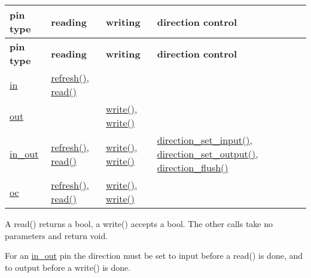 \tabulinesep=1mm
\begin{longtabu} spread 0pt [c]{*{4}{|X[-1]}|}
\hline
\rowcolor{\tableheadbgcolor}\textbf{ pin type }&\textbf{ reading }&\textbf{ writing }&\textbf{ direction control  }\\
\endfirsthead
\hline
\endfoot
\hline
\rowcolor{\tableheadbgcolor}\textbf{ pin type }&\textbf{ reading }&\textbf{ writing }&\textbf{ direction control  }\\
\endhead
\hyperlink{classhwlib_1_1pin__in}{in} &\hyperlink{classhwlib_1_1pin__in_a3fb1bfb1ec962bb6d31a5e865f0d0acb}{refresh()}, \hyperlink{classhwlib_1_1pin__in_ad071bd2e17bb4af51390f6cbb728a194}{read()} &&\\
\hyperlink{classhwlib_1_1pin__out}{out} &&\hyperlink{classhwlib_1_1pin__out_a8d260a70e503dcfb81987c408e170300}{write()}, \hyperlink{classhwlib_1_1pin__out_a8d260a70e503dcfb81987c408e170300}{write()} &\\
\hyperlink{classhwlib_1_1pin__in__out}{in\+\_\+out} &\hyperlink{classhwlib_1_1pin__in_a3fb1bfb1ec962bb6d31a5e865f0d0acb}{refresh()}, \hyperlink{classhwlib_1_1pin__in_ad071bd2e17bb4af51390f6cbb728a194}{read()} &\hyperlink{classhwlib_1_1pin__out_a8d260a70e503dcfb81987c408e170300}{write()}, \hyperlink{classhwlib_1_1pin__out_a8d260a70e503dcfb81987c408e170300}{write()} &\hyperlink{classhwlib_1_1pin__in__out_a54ce1a5086d3c9e7b868511b1d46acd0}{direction\+\_\+set\+\_\+input()}, \hyperlink{classhwlib_1_1pin__in__out_ad08a5f5e9a4c3aadaa7c665b98f2418e}{direction\+\_\+set\+\_\+output()}, \hyperlink{classhwlib_1_1pin__in__out_a86ef2b296683d8c0133280075c82cb51}{direction\+\_\+flush()} \\
\hyperlink{classhwlib_1_1pin__oc}{oc} &\hyperlink{classhwlib_1_1pin__in_a3fb1bfb1ec962bb6d31a5e865f0d0acb}{refresh()}, \hyperlink{classhwlib_1_1pin__in_ad071bd2e17bb4af51390f6cbb728a194}{read()} &\hyperlink{classhwlib_1_1pin__out_a8d260a70e503dcfb81987c408e170300}{write()}, \hyperlink{classhwlib_1_1pin__out_a8d260a70e503dcfb81987c408e170300}{write()} &\\
\end{longtabu}
A read() returns a bool, a write() accepts a bool. The other calls take no parameters and return void.


\begin{DoxyCodeInclude}
\end{DoxyCodeInclude}

\begin{DoxyCodeInclude}
\end{DoxyCodeInclude}
 For an \hyperlink{classhwlib_1_1pin__in__out}{in\+\_\+out} pin the direction must be set to input before a read() is done, and to output before a write() is done.


